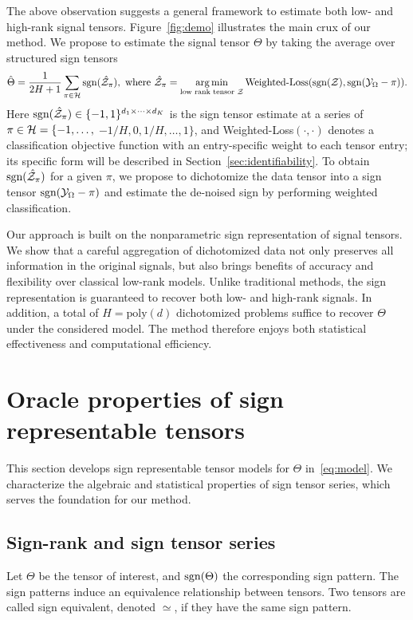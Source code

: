\documentclass{article}
\theoremstyle{plain}
\theoremstyle{definition}
\def\sign{\textup{sgn}}
\begin{document}
The above observation suggests a general framework to estimate both low- and high-rank signal tensors. Figure~\ref{fig:demo} illustrates the main crux of our method. We propose to estimate the signal tensor $\Theta$ by taking the average over structured sign tensors
\begin{equation}\label{eq:intuition}
\hat \Theta = {1\over 2H+1}\sum_{\pi \in \tH} \sign(\hat \tZ_\pi), \ \text{where}\ \hat \tZ_\pi=\argmin_{\text{low rank tensor $\tZ$}} \text{Weighted-Loss}(\sign(\tZ), \sign (\tY_\Omega-\pi)).
\end{equation}
Here $\sign(\hat \tZ_\pi)\in\{-1,1\}^{d_1\times\cdots\times d_K}$ is the sign tensor estimate at a series of $\pi\in \tH=\{\small-1,\ldots,$ $-{1/H},0, {1/H},\ldots,1\}$, and Weighted-Loss$(\cdot,\cdot)$ denotes a classification objective function with an entry-specific weight to each tensor entry; its specific form will be described in Section~\ref{sec:identifiability}. To obtain $\sign(\hat \tZ_\pi)$ for a given $\pi$, we propose to dichotomize the data tensor into a sign tensor $\sign (\tY_\Omega-\pi)$ and estimate the de-noised sign by performing weighted classification. 

Our approach is built on the nonparametric sign representation of signal tensors. We show that a careful aggregation of dichotomized data not only preserves all information in the original signals, but also brings benefits of accuracy and flexibility over classical low-rank models. Unlike traditional methods, the sign representation is guaranteed to recover both low- and high-rank signals. In addition, a total of $H=\text{poly}(d)$ dichotomized problems suffice to recover $\Theta$ under the considered model.  The method therefore enjoys both statistical effectiveness and computational efficiency. 

\section{Oracle properties of sign representable tensors}\label{sec:representation}
This section develops sign representable tensor models for $\Theta$ in~\eqref{eq:model}. We characterize the algebraic and statistical properties of sign tensor series, which serves the foundation for our method. 


\subsection{Sign-rank and sign tensor series}\label{sec:sign-rank}
Let $\Theta$ be the tensor of interest, and $\sign (\Theta)$ the corresponding sign pattern. The sign patterns induce an equivalence relationship between tensors. Two tensors are called sign equivalent, denoted $\simeq$, if they have the same sign pattern.
\end{document}

